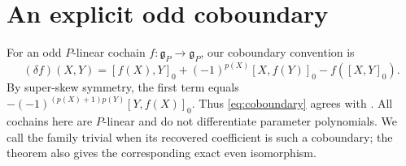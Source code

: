 \documentclass[11pt]{article}
\numberwithin{equation}{section}
\theoremstyle{remark}
\begin{document}
\section{An explicit odd coboundary}\label{sec:trivialization}

For an odd $P$-linear cochain $f:\mathfrak g_P\to\mathfrak g_P$, our
coboundary convention is
\begin{equation}\label{eq:coboundary}
 (\delta f)(X,Y)=[f(X),Y]_0+(-1)^{p(X)}[X,f(Y)]_0-f([X,Y]_0).
\end{equation}
By super-skew symmetry, the first term equals
$-(-1)^{(p(X)+1)p(Y)}[Y,f(X)]_0$. Thus \eqref{eq:coboundary} agrees with
\cite[Equation~(4.5)]{BS17}. All cochains here are $P$-linear and do not
differentiate parameter polynomials. We call the family trivial
when its recovered coefficient is such a coboundary; the theorem also gives the
corresponding exact even isomorphism.
\end{document}
